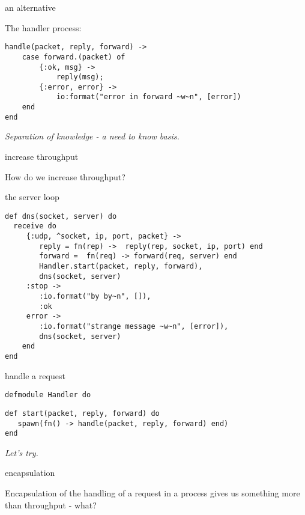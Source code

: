 \begin{frame}[fragile]{an alternative}

The handler process:
\pause
\begin{verbatim}
handle(packet, reply, forward) ->    
    case forward.(packet) of
        {:ok, msg} ->
            reply(msg);
        {:error, error} ->
            io:format("error in forward ~w~n", [error])
    end
end
\end{verbatim}

\vspace{10pt}\pause
{\em Separation of knowledge - a need to know basis.}

\end{frame}


\begin{frame}{increase throughput}

How do we increase throughput?

\end{frame}


\begin{frame}[fragile]{the server loop}

\begin{verbatim}
def dns(socket, server) do
  receive do
     {:udp, ^socket, ip, port, packet} ->
        reply = fn(rep) ->  reply(rep, socket, ip, port) end
        forward =  fn(req) -> forward(req, server) end
        Handler.start(packet, reply, forward),
        dns(socket, server)
     :stop ->
        :io.format("by by~n", []),
        :ok
     error ->
        :io.format("strange message ~w~n", [error]),
        dns(socket, server)
    end
end
\end{verbatim}

\end{frame}


\begin{frame}[fragile]{handle a request}

\pause

\begin{verbatim}
defmodule Handler do
\end{verbatim}

\pause
\begin{verbatim}
def start(packet, reply, forward) do
   spawn(fn() -> handle(packet, reply, forward) end)
end
\end{verbatim}

\pause
{\em Let's try.}
\end{frame}

\begin{frame}{encapsulation}

Encapsulation of the handling of a request in a process gives us something more than throughput - what?

\end{frame}


